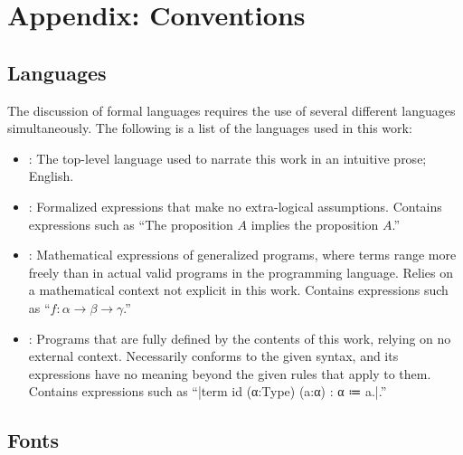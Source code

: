 \chapter{Appendix: Conventions}
\label{app:conventions}

\section{Languages}

The discussion of formal languages requires the use of several different languages simultaneously.
The following is a list of the languages used in this work:
\begin{itemize}
  \item {}:
    The top-level language used to narrate this work in an intuitive prose;
    English.
  \item {}:
    Formalized expressions that make no extra-logical assumptions.
    Contains expressions such as ``The proposition $A$ implies the proposition $A$.''
  \item {}:
    Mathematical expressions of generalized programs, where terms range more freely than in actual valid programs in the programming language.
    Relies on a mathematical context not explicit in this work.
    Contains expressions such as ``$f : α \to β \to γ$.''
  \item {}:
    Programs that are fully defined by the contents of this work, relying on no external context.
    Necessarily conforms to the given syntax, and its expressions have no meaning beyond the given rules that apply to them.
    Contains expressions such as ``\code|term id (α:Type) (a:α) : α ≔ a.|.''
\end{itemize}

\section{Fonts}

